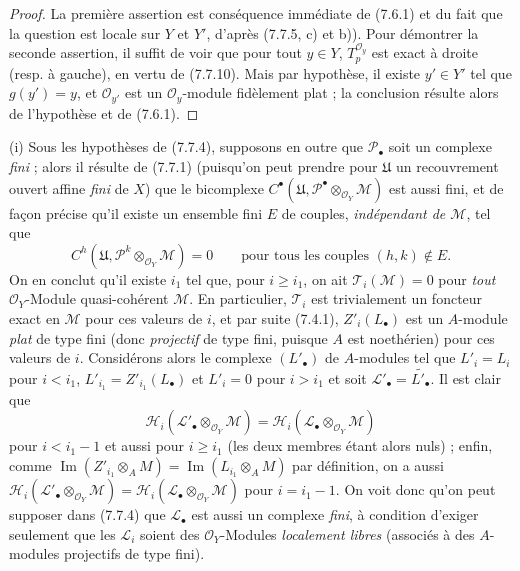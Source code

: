 \begin{proof}
La première assertion est conséquence immédiate de (7.6.1) et du fait que la
question est locale sur $Y$ et $Y'$, d'après (7.7.5, c) et b)). Pour démontrer
la seconde assertion, il suffit de voir que pour tout $y\in Y$,
$T_p^{\mathscr O_y}$ est exact à droite (resp. à gauche), en vertu de (7.7.10).
Mais par hypothèse, il existe $y'\in Y'$ tel que $g(y')=y$, et
$\mathscr O_{y'}$ est un $\mathscr O_y$-module fidèlement plat ; la conclusion
résulte alors de l'hypothèse et de (7.6.1).
\end{proof}

\begin{remarks}[7.7.12]
\textnormal{(i)} Sous les hypothèses de (7.7.4), supposons en outre que
$\mathscr P_\bullet$ soit un complexe \emph{fini} ; alors il résulte de (7.7.1)
(puisqu'on peut prendre pour $\mathfrak U$ un recouvrement ouvert affine
\emph{fini} de $X$) que le bicomplexe
$C^\bullet(\mathfrak U,\mathscr P^\bullet\otimes_{\mathscr O_Y}\mathscr M)$ est
aussi fini, et de façon précise qu'il existe un ensemble fini $E$ de couples,
\emph{indépendant de $\mathscr M$}, tel que
\[
  C^h(\mathfrak U,\mathscr P^k\otimes_{\mathscr O_Y}\mathscr M)=0
  \qquad\text{pour tous les couples }(h,k)\notin E.
\]
On en conclut qu'il existe $i_1$ tel que, pour $i\geq i_1$, on ait
$\mathscr T_i(\mathscr M)=0$ pour \emph{tout} $\mathscr O_Y$-Module
quasi-cohérent $\mathscr M$. En particulier, $\mathscr T_i$ est trivialement un
foncteur exact en $\mathscr M$ pour ces valeurs de $i$, et par suite (7.4.1),
$Z'_i(L_\bullet)$ est un $A$-module \emph{plat} de type fini (donc
\emph{projectif} de type fini, puisque $A$ est noethérien) pour ces valeurs de
$i$. Considérons alors le complexe $(L'_\bullet)$ de $A$-modules tel que
$L'_i=L_i$ pour $i<i_1$, $L'_{i_1}=Z'_{i_1}(L_\bullet)$ et $L'_i=0$ pour
$i>i_1$ et soit $\mathscr L'_\bullet=\widetilde{L'_\bullet}$. Il est clair que
\[
  \mathscr H_i(\mathscr L'_\bullet\otimes_{\mathscr O_Y}\mathscr M)
  =
  \mathscr H_i(\mathscr L_\bullet\otimes_{\mathscr O_Y}\mathscr M)
\]
pour $i<i_1-1$ et aussi pour $i\geq i_1$ (les deux membres étant alors nuls) ;
enfin, comme
$\operatorname{Im}(Z'_{i_1}\otimes_A M)=\operatorname{Im}(L_{i_1}\otimes_A M)$
par définition, on a aussi
$\mathscr H_i(\mathscr L'_\bullet\otimes_{\mathscr O_Y}\mathscr M)
=\mathscr H_i(\mathscr L_\bullet\otimes_{\mathscr O_Y}\mathscr M)$ pour
$i=i_1-1$. On voit donc qu'on peut supposer dans (7.7.4) que
$\mathscr L_\bullet$ est aussi un complexe \emph{fini}, à condition d'exiger
seulement que les $\mathscr L_i$ soient des $\mathscr O_Y$-Modules
\emph{localement libres} (associés à des $A$-modules projectifs de type fini).


\end{remarks}

